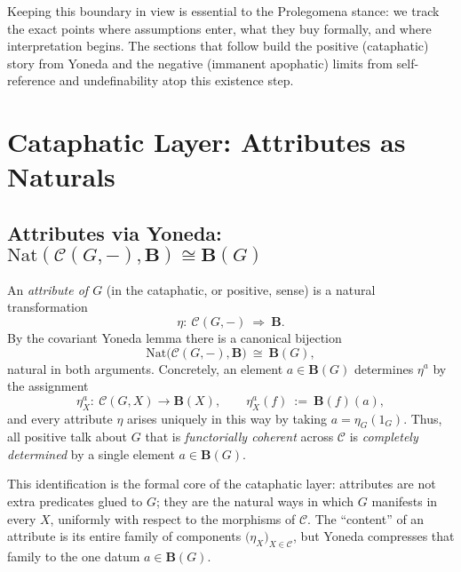 \documentclass[11pt]{article}
\theoremstyle{upright}
\begin{document}
Keeping this boundary in view is essential to the Prolegomena stance: we track the exact points where assumptions enter, what they buy formally, and where interpretation begins. The sections that follow build the positive (cataphatic) story from Yoneda and the negative (immanent apophatic) limits from self-reference and undefinability \citep{Tarski1956} atop this existence step.

\section{Cataphatic Layer: Attributes as Naturals}\label{sec:cataphatic}

\subsection{Attributes via Yoneda: \texorpdfstring{$\mathrm{Nat}(\mathcal C(G,-),\mathbf B)\cong \mathbf B(G)$}{Nat(C(G,-),B) ≅ B(G)}}
An \emph{attribute of \(G\)} (in the cataphatic, or positive, sense) is a natural transformation
\[
\eta:\ \mathcal C(G,-)\ \Rightarrow\ \mathbf B.
\]
By the covariant Yoneda lemma there is a canonical bijection
\[
\mathrm{Nat}\big(\mathcal C(G,-),\mathbf B\big)\ \cong\ \mathbf B(G),
\]
natural in both arguments. Concretely, an element \(a\in \mathbf B(G)\) determines \(\eta^a\) by the assignment
\[
\eta^a_X:\ \mathcal C(G,X)\longrightarrow \mathbf B(X),\qquad
\eta^a_X(f)\ :=\ \mathbf B(f)(a),
\]
and every attribute \(\eta\) arises uniquely in this way by taking \(a=\eta_G(1_G)\). Thus, all positive talk about \(G\) that is \emph{functorially coherent} across \(\mathcal C\) is \emph{completely determined} by a single element \(a\in\mathbf B(G)\).

This identification is the formal core of the cataphatic layer: attributes are not extra predicates glued to \(G\); they are the natural ways in which \(G\) manifests in every \(X\), uniformly with respect to the morphisms of \(\mathcal C\). The “content” of an attribute is its entire family of components \(\big(\eta_X\big)_{X\in\mathcal C}\), but Yoneda compresses that family to the one datum \(a\in \mathbf B(G)\).
\end{document}
